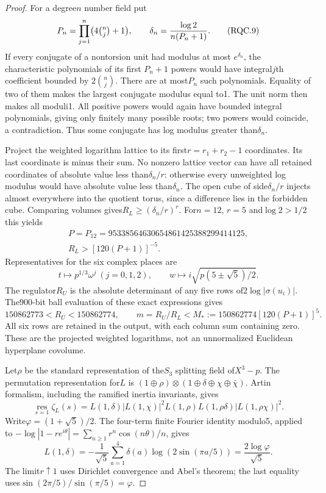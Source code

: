 \begin{proof}
For a degree$n$ number field put
\[
 P_n=\prod_{j=1}^{n}\bigl(4\tbinom nj+1\bigr),\qquad
 \delta_n=\frac{\log2}{n(P_n+1)}.
 \tag{RQC.9}
\]
If every conjugate of a nontorsion unit had modulus at most
$e^{\delta_n}$, the characteristic polynomials of its first
$P_n+1$ powers would have integral$j$th coefficient bounded by
$2\binom nj$.  There are at most$P_n$ such polynomials.  Equality
of two of them makes the largest conjugate modulus equal to1.
The unit norm then makes all moduli1.  All positive powers would
again have bounded integral polynomials, giving only finitely many
possible roots; two powers would coincide, a contradiction.
Thus some conjugate has log modulus greater than$\delta_n$.

Project the weighted logarithm lattice to its first$r=r_1+r_2-1$
coordinates.  Its last coordinate is minus their sum.
No nonzero lattice vector can have all retained coordinates of
absolute value less than$\delta_n/r$: otherwise every unweighted
log modulus would have absolute value less than$\delta_n$.
The open cube of side$\delta_n/r$ injects almost everywhere into
the quotient torus, since a difference lies in the forbidden cube.
Comparing volumes gives$R_L\ge(\delta_n/r)^r$.
For$n=12$, $r=5$ and$\log2>1/2$ this yields
\[
 \begin{gathered}
 P=P_{12}=95338564630654861425388299414125,\\
 R_L>[120(P+1)]^{-5}.
 \end{gathered}
 \tag{RQC.10}
\]
Representatives for the six complex places are
\[
 t\longmapsto p^{1/3}\omega^j\ (j=0,1,2),\qquad
 w\longmapsto i\sqrt{p(5\pm\sqrt5)/2}.
 \tag{RQC.11}
\]
The regulator$R_U$ is the absolute determinant of any five rows
of$2\log|\sigma(u_i)|$.  The900-bit ball evaluation of these
exact expressions gives
\[
 150862773<R_U<150862774,\qquad
 m=R_U/R_L<M_*:=150862774[120(P+1)]^5.
 \tag{RQC.12}
\]
All six rows are retained in the output, with each column sum
containing zero.  These are the projected weighted logarithms,
not an unnormalized Euclidean hyperplane covolume.

Let$\rho$ be the standard representation of the$S_3$ splitting field
of$X^3-p$.  The permutation representation for$L$ is
$(1\oplus\rho)\otimes(1\oplus\delta\oplus\chi\oplus\bar\chi)$.
Artin formalism, including the ramified inertia invariants, gives
\[
 \operatorname*{res}_{s=1}\zeta_L(s)
  =L(1,\delta)|L(1,\chi)|^2
        L(1,\rho)L(1,\rho\delta)|L(1,\rho\chi)|^2.
 \tag{RQC.13}
\]
Write$\varphi=(1+\sqrt5)/2$.
The four-term finite Fourier identity modulo5, applied to
$-\log|1-re^{i\theta}|=\sum_{n\ge1}r^n\cos(n\theta)/n$, gives
\[
 L(1,\delta)
   =-\frac1{\sqrt5}\sum_{a=1}^4\delta(a)
                   \log(2\sin(\pi a/5))
   =\frac{2\log\varphi}{\sqrt5}.
 \tag{RQC.14}
\]
The limit$r\uparrow1$ uses Dirichlet convergence and Abel's theorem;
the last equality uses$\sin(2\pi/5)/\sin(\pi/5)=\varphi$.


\end{proof}
